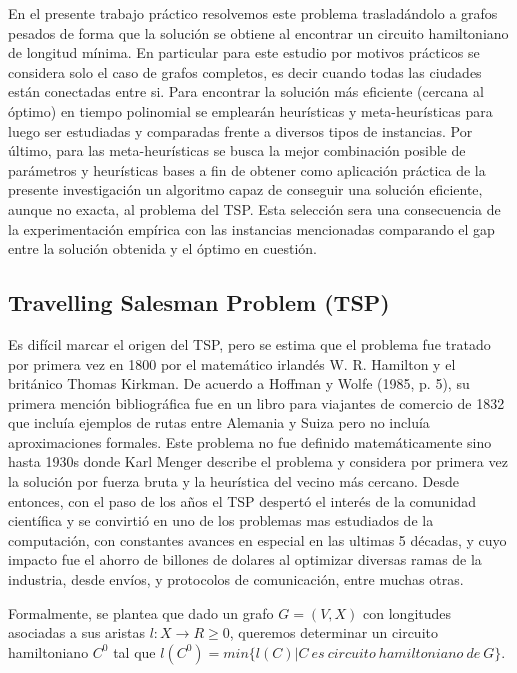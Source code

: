 \documentclass[10pt,a4paper]{article}
\begin{document}
En el presente trabajo práctico resolvemos este problema trasladándolo a grafos pesados de forma que la solución se obtiene al encontrar un circuito hamiltoniano de longitud mínima. En particular para este estudio por motivos prácticos se considera solo el caso de grafos completos, es decir cuando todas las ciudades están conectadas entre si. Para encontrar la  solución más eficiente (cercana al óptimo) en tiempo polinomial se emplearán heurísticas y meta-heurísticas para luego ser estudiadas y comparadas frente a diversos tipos de instancias.
Por último, para las meta-heurísticas se busca la mejor combinación posible de parámetros y heurísticas bases a fin de obtener como aplicación práctica de la presente investigación un algoritmo capaz de conseguir una solución eficiente, aunque no exacta, al problema del TSP. Esta selección sera una consecuencia de la experimentación empírica con las instancias mencionadas comparando el gap entre la solución obtenida y el óptimo en cuestión.  

\subsection{Travelling Salesman Problem (TSP)}

Es difícil marcar el origen del TSP, pero se estima que el problema fue tratado por primera vez en 1800 por el matemático irlandés W. R. Hamilton y el británico Thomas Kirkman. De acuerdo a Hoffman y Wolfe (1985, p. 5), su primera mención bibliográfica fue en un libro para viajantes de comercio de 1832 que incluía ejemplos de rutas entre Alemania y Suiza pero no incluía aproximaciones formales. Este problema no fue definido matemáticamente sino hasta 1930s donde Karl Menger describe el problema y considera por primera vez la solución por fuerza bruta y la heurística del vecino más cercano. Desde entonces, con el paso de los años el TSP despertó el interés de la comunidad científica y se convirtió en uno de los problemas mas estudiados de la computación, con constantes avances en especial en las ultimas 5 décadas, y cuyo impacto fue el ahorro de billones de dolares al optimizar diversas ramas de la industria, desde envíos, y protocolos de comunicación, entre muchas otras. 

Formalmente, se plantea que dado un grafo \boldmath$G=(V,X)$ con longitudes asociadas a sus aristas $l: X \rightarrow R \geq 0$, queremos determinar un circuito hamiltoniano $C^0$ tal que $l(C^0)=min\{l(C)|C\ es\ circuito\ hamiltoniano\ de\ G\}$. \cite{teo:Hamiltoniano}
\end{document}
